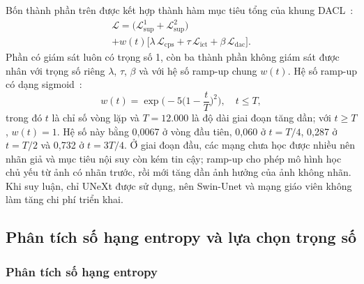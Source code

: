 \documentclass{IEEEtran}
\newcommand{\Lx}[1]{\mathcal{L}_{\mathrm{#1}}}
\begin{document}
Bốn thành phần trên được kết hợp thành hàm mục tiêu tổng của khung DACL~\cite{dacl}:
\begin{multline}
  \mathcal{L} = \big(\Lx{sup}^{1}+\Lx{sup}^{2}\big)\\
  + w(t)\big[\lambda\,\Lx{cps} + \tau\,\Lx{ict} + \beta\,\Lx{dac}\big]. \label{eq:total}
\end{multline}
Phần có giám sát luôn có trọng số 1, còn ba thành phần không giám sát được nhân với trọng số riêng $\lambda$, $\tau$, $\beta$ và với hệ số ramp-up chung $w(t)$. Hệ số ramp-up có dạng sigmoid~\cite{rampup}:
\begin{equation}
  w(t) = \exp\Big(-5\Big(1-\frac{t}{T}\Big)^{2}\Big), \quad t\le T, \label{eq:ramp}
\end{equation}
trong đó $t$ là chỉ số vòng lặp và $T=12.000$ là độ dài giai đoạn tăng dần; với $t\ge T$, $w(t)=1$. Hệ số này bằng 0,0067 ở vòng đầu tiên, 0,060 ở $t=T/4$, 0,287 ở $t=T/2$ và 0,732 ở $t=3T/4$. Ở giai đoạn đầu, các mạng chưa học được nhiều nên nhãn giả và mục tiêu nội suy còn kém tin cậy; ramp-up cho phép mô hình học chủ yếu từ ảnh có nhãn trước, rồi mới tăng dần ảnh hưởng của ảnh không nhãn. Khi suy luận, chỉ UNeXt được sử dụng, nên Swin-Unet và mạng giáo viên không làm tăng chi phí triển khai.

\subsection{Phân tích số hạng entropy và lựa chọn trọng số}

\subsubsection{Phân tích số hạng entropy}
\label{sec:entropy}
\end{document}
